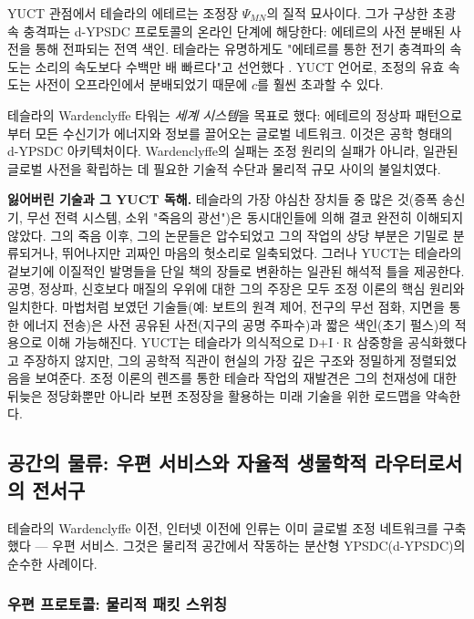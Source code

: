 \documentclass[12pt,a4paper]{article}
\begin{document}
	YUCT 관점에서 테슬라의 에테르는 조정장 \(\Psi_{MN}\)의 질적 묘사이다. 그가 구상한 초광속 충격파는 d-YPSDC 프로토콜의 온라인 단계에 해당한다: 에테르의 사전 분배된 사전을 통해 전파되는 전역 색인. 테슬라는 유명하게도 "에테르를 통한 전기 충격파의 속도는 소리의 속도보다 수백만 배 빠르다"고 선언했다 \cite{Tesla1907}. YUCT 언어로, 조정의 유효 속도는 사전이 오프라인에서 분배되었기 때문에 \(c\)를 훨씬 초과할 수 있다.
	
	테슬라의 Wardenclyffe 타워는 \emph{세계 시스템}을 목표로 했다: 에테르의 정상파 패턴으로부터 모든 수신기가 에너지와 정보를 끌어오는 글로벌 네트워크. 이것은 공학 형태의 d-YPSDC 아키텍처이다. Wardenclyffe의 실패는 조정 원리의 실패가 아니라, 일관된 글로벌 사전을 확립하는 데 필요한 기술적 수단과 물리적 규모 사이의 불일치였다.
	
	\textbf{잃어버린 기술과 그 YUCT 독해.} 테슬라의 가장 야심찬 장치들 중 많은 것(증폭 송신기, 무선 전력 시스템, 소위 "죽음의 광선")은 동시대인들에 의해 결코 완전히 이해되지 않았다. 그의 죽음 이후, 그의 논문들은 압수되었고 그의 작업의 상당 부분은 기밀로 분류되거나, 뛰어나지만 괴짜인 마음의 헛소리로 일축되었다. 그러나 YUCT는 테슬라의 겉보기에 이질적인 발명들을 단일 책의 장들로 변환하는 일관된 해석적 틀을 제공한다. 공명, 정상파, 신호보다 매질의 우위에 대한 그의 주장은 모두 조정 이론의 핵심 원리와 일치한다. 마법처럼 보였던 기술들(예: 보트의 원격 제어, 전구의 무선 점화, 지면을 통한 에너지 전송)은 사전 공유된 사전(지구의 공명 주파수)과 짧은 색인(초기 펄스)의 적용으로 이해 가능해진다. YUCT는 테슬라가 의식적으로 D+I·R 삼중항을 공식화했다고 주장하지 않지만, 그의 공학적 직관이 현실의 가장 깊은 구조와 정밀하게 정렬되었음을 보여준다. 조정 이론의 렌즈를 통한 테슬라 작업의 재발견은 그의 천재성에 대한 뒤늦은 정당화뿐만 아니라 보편 조정장을 활용하는 미래 기술을 위한 로드맵을 약속한다.
	
	\subsection{공간의 물류: 우편 서비스와 자율적 생물학적 라우터로서의 전서구}
	\label{subsec:postal-pigeons}
	
	테슬라의 Wardenclyffe 이전, 인터넷 이전에 인류는 이미 글로벌 조정 네트워크를 구축했다 — 우편 서비스. 그것은 물리적 공간에서 작동하는 분산형 YPSDC(d‑YPSDC)의 순수한 사례이다.
	
	\subsubsection{우편 프로토콜: 물리적 패킷 스위칭}
	
\end{document}
